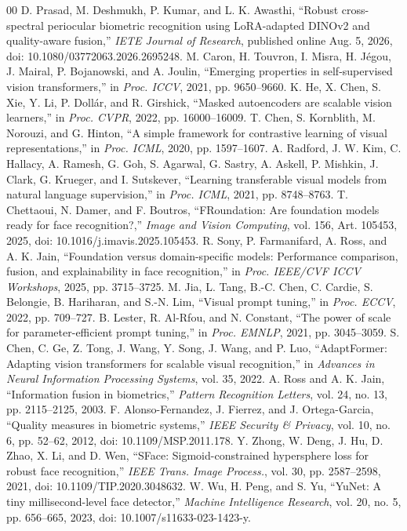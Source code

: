 \documentclass[10pt,journal,compsoc]{IEEEtran}
\begin{document}
\begin{thebibliography}{00}
 D. Prasad, M. Deshmukh, P. Kumar, and L. K. Awasthi, ``Robust cross-spectral periocular biometric recognition using LoRA-adapted DINOv2 and quality-aware fusion,'' \textit{IETE Journal of Research}, published online Aug. 5, 2026, doi: 10.1080/03772063.2026.2695248.
 M. Caron, H. Touvron, I. Misra, H. J\'egou, J. Mairal, P. Bojanowski, and A. Joulin, ``Emerging properties in self-supervised vision transformers,'' in \textit{Proc. ICCV}, 2021, pp. 9650--9660.
 K. He, X. Chen, S. Xie, Y. Li, P. Doll\'ar, and R. Girshick, ``Masked autoencoders are scalable vision learners,'' in \textit{Proc. CVPR}, 2022, pp. 16000--16009.
 T. Chen, S. Kornblith, M. Norouzi, and G. Hinton, ``A simple framework for contrastive learning of visual representations,'' in \textit{Proc. ICML}, 2020, pp. 1597--1607.
 A. Radford, J. W. Kim, C. Hallacy, A. Ramesh, G. Goh, S. Agarwal, G. Sastry, A. Askell, P. Mishkin, J. Clark, G. Krueger, and I. Sutskever, ``Learning transferable visual models from natural language supervision,'' in \textit{Proc. ICML}, 2021, pp. 8748--8763.
 T. Chettaoui, N. Damer, and F. Boutros, ``FRoundation: Are foundation models ready for face recognition?,'' \textit{Image and Vision Computing}, vol. 156, Art. 105453, 2025, doi: 10.1016/j.imavis.2025.105453.
 R. Sony, P. Farmanifard, A. Ross, and A. K. Jain, ``Foundation versus domain-specific models: Performance comparison, fusion, and explainability in face recognition,'' in \textit{Proc. IEEE/CVF ICCV Workshops}, 2025, pp. 3715--3725.
 M. Jia, L. Tang, B.-C. Chen, C. Cardie, S. Belongie, B. Hariharan, and S.-N. Lim, ``Visual prompt tuning,'' in \textit{Proc. ECCV}, 2022, pp. 709--727.
 B. Lester, R. Al-Rfou, and N. Constant, ``The power of scale for parameter-efficient prompt tuning,'' in \textit{Proc. EMNLP}, 2021, pp. 3045--3059.
 S. Chen, C. Ge, Z. Tong, J. Wang, Y. Song, J. Wang, and P. Luo, ``AdaptFormer: Adapting vision transformers for scalable visual recognition,'' in \textit{Advances in Neural Information Processing Systems}, vol. 35, 2022.
 A. Ross and A. K. Jain, ``Information fusion in biometrics,'' \textit{Pattern Recognition Letters}, vol. 24, no. 13, pp. 2115--2125, 2003.
 F. Alonso-Fernandez, J. Fierrez, and J. Ortega-Garcia, ``Quality measures in biometric systems,'' \textit{IEEE Security \& Privacy}, vol. 10, no. 6, pp. 52--62, 2012, doi: 10.1109/MSP.2011.178.
 Y. Zhong, W. Deng, J. Hu, D. Zhao, X. Li, and D. Wen, ``SFace: Sigmoid-constrained hypersphere loss for robust face recognition,'' \textit{IEEE Trans. Image Process.}, vol. 30, pp. 2587--2598, 2021, doi: 10.1109/TIP.2020.3048632.
 W. Wu, H. Peng, and S. Yu, ``YuNet: A tiny millisecond-level face detector,'' \textit{Machine Intelligence Research}, vol. 20, no. 5, pp. 656--665, 2023, doi: 10.1007/s11633-023-1423-y.
\end{thebibliography}
\end{document}

